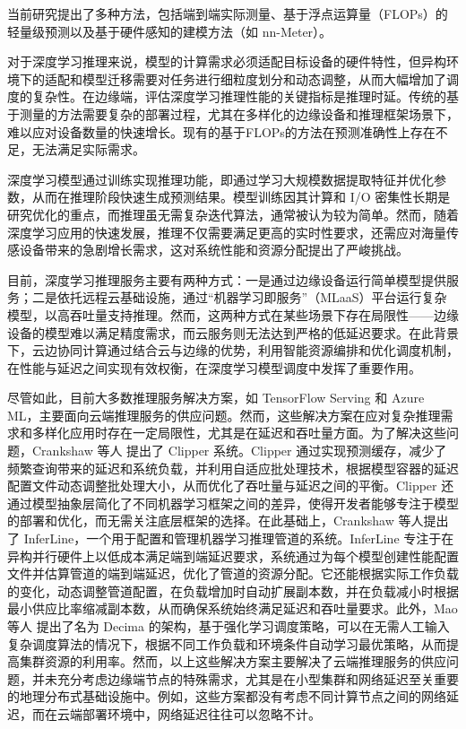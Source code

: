 当前研究提出了多种方法，包括端到端实际测量、基于浮点运算量（FLOPs）的轻量级预测以及基于硬件感知的建模方法（如 nn-Meter）。

对于深度学习推理来说，模型的计算需求必须适配目标设备的硬件特性，但异构环境下的适配和模型迁移需要对任务进行细粒度划分和动态调整，从而大幅增加了调度的复杂性。在边缘端，评估深度学习推理性能的关键指标是推理时延。传统的基于测量的方法需要复杂的部署过程，尤其在多样化的边缘设备和推理框架场景下，难以应对设备数量的快速增长。现有的基于FLOPs的方法在预测准确性上存在不足，无法满足实际需求。


深度学习模型通过训练实现推理功能，即通过学习大规模数据提取特征并优化参数，从而在推理阶段快速生成预测结果。模型训练因其计算和 I/O 密集性长期是研究优化的重点，而推理虽无需复杂迭代算法，通常被认为较为简单。然而，随着深度学习应用的快速发展，推理不仅需要满足更高的实时性要求，还需应对海量传感设备带来的急剧增长需求，这对系统性能和资源分配提出了严峻挑战。

目前，深度学习推理服务主要有两种方式：一是通过边缘设备运行简单模型提供服务；二是依托远程云基础设施，通过“机器学习即服务”（MLaaS）平台运行复杂模型，以高吞吐量支持推理。然而，这两种方式在某些场景下存在局限性——边缘设备的模型难以满足精度需求，而云服务则无法达到严格的低延迟要求。在此背景下，云边协同计算通过结合云与边缘的优势，利用智能资源编排和优化调度机制，在性能与延迟之间实现有效权衡，在深度学习模型调度中发挥了重要作用。

尽管如此，目前大多数推理服务解决方案，如 TensorFlow Serving\cite{olston2017tensorflow} 和 Azure ML\cite{chappell2015introducing}，主要面向云端推理服务的供应问题。然而，这些解决方案在应对复杂推理需求和多样化应用时存在一定局限性，尤其是在延迟和吞吐量方面。为了解决这些问题，Crankshaw 等人\cite{crankshaw2017clipper} 提出了 Clipper 系统。Clipper 通过实现预测缓存，减少了频繁查询带来的延迟和系统负载，并利用自适应批处理技术，根据模型容器的延迟配置文件动态调整批处理大小，从而优化了吞吐量与延迟之间的平衡。Clipper 还通过模型抽象层简化了不同机器学习框架之间的差异，使得开发者能够专注于模型的部署和优化，而无需关注底层框架的选择。在此基础上，Crankshaw 等人\cite{crankshaw2020inferline}提出了 InferLine，一个用于配置和管理机器学习推理管道的系统。InferLine 专注于在异构并行硬件上以低成本满足端到端延迟要求，系统通过为每个模型创建性能配置文件并估算管道的端到端延迟，优化了管道的资源分配。它还能根据实际工作负载的变化，动态调整管道配置，在负载增加时自动扩展副本数，并在负载减小时根据最小供应比率缩减副本数，从而确保系统始终满足延迟和吞吐量要求。此外，Mao 等人\cite{mao2019learning} 提出了名为 Decima 的架构，基于强化学习调度策略，可以在无需人工输入复杂调度算法的情况下，根据不同工作负载和环境条件自动学习最优策略，从而提高集群资源的利用率。然而，以上这些解决方案主要解决了云端推理服务的供应问题，并未充分考虑边缘端节点的特殊需求，尤其是在小型集群和网络延迟至关重要的地理分布式基础设施中。例如，这些方案都没有考虑不同计算节点之间的网络延迟，而在云端部署环境中，网络延迟往往可以忽略不计。

